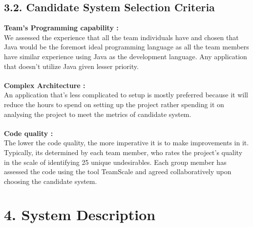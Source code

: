 \documentclass[letterpaper, 11pt]{report}
\begin{document}
\subsection*{3.2. Candidate System Selection Criteria}
\normalsize{\textbf{Team’s Programming capability :}\\
We assessed the experience that all the team individuals have and chosen that Java would be the foremost ideal programming language as all the team members have similar experience using Java as the development language. Any application  that doesn’t utilize Java given lesser priority.}\\
\\
\normalsize{\textbf{Complex Architecture :}\\
An application that's less complicated to setup is mostly preferred because it will reduce the hours to spend on setting up the project rather spending it on analysing the project to meet the metrics of candidate system.}\\
\\
\normalsize{\textbf{Code quality :}\\
The lower the code quality, the more imperative it is to make improvements in it. Typically, its determined by each team member, who rates the project’s quality in the scale of identifying 25 unique undesirables. Each group member has assessed the code using the tool TeamScale and agreed collaboratively upon choosing the candidate system.}\\
\pagebreak
{}
\section*{4. System Description}
\end{document}
